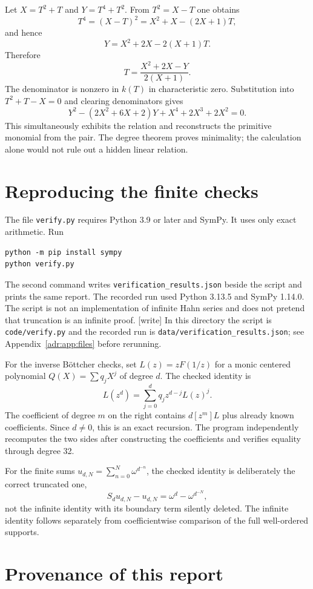 \documentclass[11pt,letterpaper]{article}
\numberwithin{equation}{section}
\theoremstyle{definition}
\theoremstyle{remark}
\newcommand{\rpath}[1]{\nolinkurl{#1}}%
\newcommand{\wtag}{\textup{[write]}}%
\begin{document}
Let $X=T^2+T$ and $Y=T^4+T^2$. From $T^2=X-T$ one obtains
\[
 T^4=(X-T)^2=X^2+X-(2X+1)T,
\]
and hence
\[
 Y=X^2+2X-2(X+1)T.
\]
Therefore
\[
 T=\frac{X^2+2X-Y}{2(X+1)}.
\]
The denominator is nonzero in $k(T)$ in characteristic zero. Substitution
into $T^2+T-X=0$ and clearing denominators gives
\[
 Y^2-(2X^2+6X+2)Y+X^4+2X^3+2X^2=0.
\]
This simultaneously exhibits the relation and reconstructs the primitive
monomial from the pair. The degree theorem proves minimality; the
calculation alone would not rule out a hidden linear relation.

\section{Reproducing the finite checks}\label{adr:app:checks}

The file \texttt{verify.py} requires Python 3.9 or later and SymPy.
It uses only exact arithmetic. Run
\begin{verbatim}
python -m pip install sympy
python verify.py
\end{verbatim}
The second command writes \texttt{verification\_results.json} beside the
script and prints the same report. The recorded run used Python 3.13.5
and SymPy 1.14.0. The script is not an implementation of infinite Hahn
series and does not pretend that truncation is an infinite proof.
\wtag{} In this directory the script is \rpath{code/verify.py} and the
recorded run is \rpath{data/verification_results.json}; see
Appendix~\ref{adr:app:files} before rerunning.

For the inverse B\"ottcher checks, set $L(z)=zF(1/z)$ for a monic centered
polynomial $Q(X)=\sum q_jX^j$ of degree $d$. The checked identity is
\[
 L(z^d)=\sum_{j=0}^d q_j z^{d-j}L(z)^j.
\]
The coefficient of degree $m$ on the right contains $d[ z^m ]L$ plus
already known coefficients. Since $d\ne0$, this is an exact recursion.
The program independently recomputes the two sides after constructing
the coefficients and verifies equality through degree 32.

For the finite sums $u_{d,N}=\sum_{n=0}^N\omega^{d^{-n}}$, the checked
identity is deliberately the correct truncated one,
\[
 S_du_{d,N}-u_{d,N}=\omega^d-\omega^{d^{-N}},
\]
not the infinite identity with its boundary term silently deleted.
The infinite identity follows separately from coefficientwise comparison
of the full well-ordered supports.

\section{Provenance of this report}\label{adr:app:report}
\end{document}
